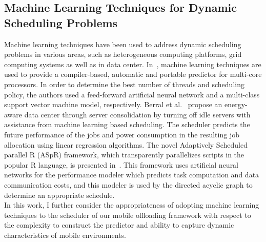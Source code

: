 \subsection{Machine Learning Techniques for Dynamic Scheduling Problems}
\label{scheduler:machine}
%
Machine learning techniques have been used to address dynamic scheduling
problems in various areas, such as heterogeneous computing platforms, grid
computing systems as well as in data center.
%
In~\cite{zheng}, machine learning techniques are used to provide a
compiler-based, automatic and portable predictor for multi-core
processors.
%
In order to determine the best number of threads and scheduling policy,
the authors used a feed-forward artificial neural network and a
multi-class support vector machine model, respectively.
%
Berral et al.~\cite{josep} propose an energy-aware
data center through server consolidation by turning off idle servers
with assistance from machine learning based scheduling.
%
The scheduler predicts the future performance of the jobs and power
consumption in the resulting job allocation using linear regression
algorithms.
%
The novel Adaptively Scheduled parallel R (ASpR) framework, which
transparently parallelizes scripts in the popular R language, is
presented in~\cite{jiangtian}.
%
This framework uses artificial neural networks for the performance
modeler which predicts task computation and data communication costs,
and this modeler is used by the directed acyclic graph to determine an
appropriate schedule.\\
%
In this work, I further consider the appropriateness of adopting
machine learning techniques to the scheduler of our mobile offloading
framework with respect to the complexity to construct the predictor and
ability to capture dynamic characteristics of mobile environments.
%
